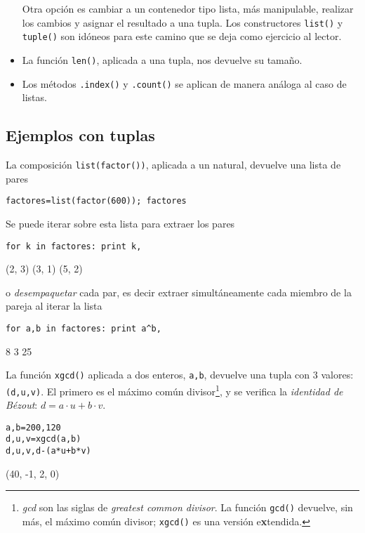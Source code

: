 \begin{itemize}
Otra opción es cambiar a un contenedor tipo lista, más manipulable, realizar
los cambios y asignar el resultado a una tupla. Los constructores
\lstinline|list()| y
\lstinline|tuple()| son idóneos para este camino que se deja como ejercicio al
lector.

\item La función \lstinline|len()|, aplicada a una tupla, nos devuelve su
tamaño.

\item Los métodos \lstinline|.index()| y \lstinline|.count()| se aplican de
manera
análoga al caso de listas.

\end{itemize}



\subsection{Ejemplos con tuplas}
\label{factoriz}
\begin{ejem}
La composición \lstinline|list(factor())|, aplicada a un natural, devuelve una
lista de pares
\begin{lstlisting}
factores=list(factor(600)); factores
\end{lstlisting}
\begin{Output}
	[(2, 3), (3, 1), (5, 2)]
\end{Output}
Se puede iterar sobre esta lista para extraer los pares 
\begin{lstlisting}
for k in factores: print k,
\end{lstlisting}
\begin{Output}
	(2, 3) (3, 1) (5, 2)
\end{Output}
o \emph{desempaquetar} cada par, es decir extraer simultáneamente cada miembro
de la 
pareja al iterar la lista
\begin{lstlisting}
for a,b in factores: print a^b,
\end{lstlisting}
\begin{Output}
	8 3 25
\end{Output}
\end{ejem}

\begin{ejem}
La función \lstinline|xgcd()| aplicada a dos enteros, \lstinline|a,b|, 
devuelve una tupla con $3$ valores: \lstinline|(d,u,v)|. El primero es el máximo
común
divisor\footnote{\emph{gcd} son las siglas de \emph{greatest common divisor}. La
función
\lstinline|gcd()| devuelve, sin más, el máximo común divisor; \lstinline|xgcd()|
es una
versión e{\bf x}tendida.}, y se verifica la \emph{identidad de Bézout}:
$d=a\cdot u+b\cdot
v$.
\begin{lstlisting}
a,b=200,120
d,u,v=xgcd(a,b)
d,u,v,d-(a*u+b*v)
\end{lstlisting}
\begin{Output}
	(40, -1, 2, 0)
\end{Output}
\end{ejem}



